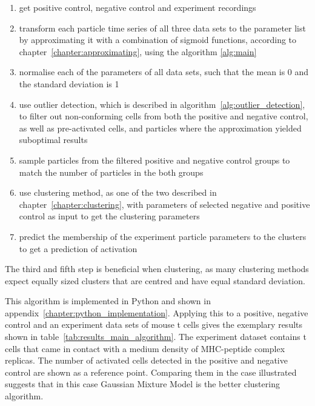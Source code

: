 \begin{enumerate}
	\item get positive control, negative control and experiment recordings
	\item transform each particle time series of all three data sets to the parameter list by approximating it with a combination of sigmoid functions, according to chapter~\ref{chapter:approximating}, using the algorithm \ref{alg:main}
	\item normalise each of the parameters of all data sets, such that the mean is 0 and the standard deviation is 1
	\item use outlier detection, which is described in algorithm~\ref{alg:outlier_detection}, to filter out non-conforming cells from both the positive and negative control, as well as pre-activated cells, and particles where the approximation yielded suboptimal results
	\item sample particles from the filtered positive and negative control groups to match the number of particles in the both groups
	\item use clustering method, as one of the two described in chapter~\ref{chapter:clustering}, with parameters of selected negative and positive control as input to get the clustering parameters
	\item predict the membership of the experiment particle parameters to the clusters to get a prediction of activation
\end{enumerate}

The third and fifth step is beneficial when clustering, as many clustering methods expect equally sized clusters that are centred and have equal standard deviation. 

This algorithm is implemented in Python and shown in appendix~\ref{chapter:python_implementation}. Applying this to a positive, negative control and an experiment data sets of mouse t cells gives the exemplary results shown in table~\ref{tab:results_main_algorithm}. The experiment dataset contains t cells that came in contact with a medium density of MHC-peptide complex replicas. The number of activated cells detected in the positive and negative control are shown as a reference point. Comparing them in the case illustrated suggests that in this case Gaussian Mixture Model is the better clustering algorithm.

